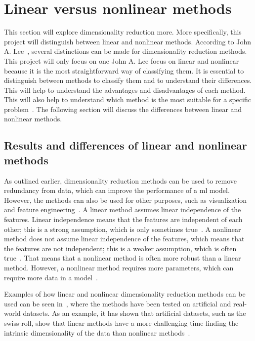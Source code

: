 \section{Linear versus nonlinear methods}\label{sec:linear-vs-nonlinear} 

This section will explore dimensionality reduction more. More specifically, this project will distinguish between linear and nonlinear methods. According to John A. Lee~\cite{nonlinear-dim-red-chapter-two}, several distinctions can be made for dimensionality reduction methods. This project will only focus on one John A. Lee focus on linear and nonlinear because it is the most straightforward way of classifying them. It is essential to distinguish between methods to classify them and to understand their differences. This will help to understand the advantages and disadvantages of each method. This will also help to understand which method is the most suitable for a specific problem~\cite{nonlinear-dim-red-chapter-two}. The following section will discuss the differences between linear and nonlinear methods. 


\subsection{Results and differences of linear and nonlinear methods}

As outlined earlier, dimensionality reduction methods can be used to remove redundancy from data, which can improve the performance of a \gls{ml} model. However, the methods can also be used for other purposes, such as visualization and feature engineering~\cite{nonlinear-dim-red-chapter-two}.
A linear method assumes linear independence of the features. Linear independence means that the features are independent of each other; this is a strong assumption, which is only sometimes true~\cite{linear-algebra-margalit}. A nonlinear method does not assume linear independence of the features, which means that the features are not independent; this is a weaker assumption, which is often true~\cite{avriel2003nonlinear}. That means that a nonlinear method is often more robust than a linear method. However, a nonlinear method requires more parameters, which can require more data in a model~\cite{nonlinear-dim-red-chapter-two}.

Examples of how linear and nonlinear dimensionality reduction methods can be used can be seen in~\cite{dimensionality-reduction-comparative-review, tennenbaum}, where the methods have been tested on artificial and real-world datasets. As an example, it has shown that artificial datasets, such as the swiss-roll, show that linear methods have a more challenging time finding the intrinsic dimensionality of the data than nonlinear methods~\cite{tennenbaum}.


